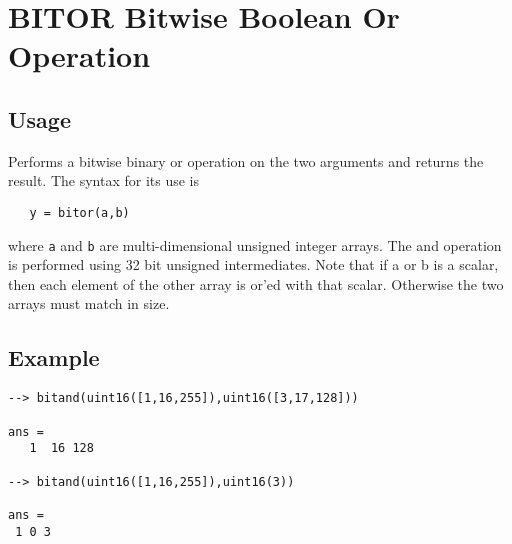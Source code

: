\section{BITOR Bitwise Boolean Or Operation}

\subsection{Usage}

Performs a bitwise binary or operation on the two arguments and
returns the result.  The syntax for its use is
\begin{verbatim}
   y = bitor(a,b)
\end{verbatim}
where \verb|a| and \verb|b| are multi-dimensional unsigned integer arrays.
The and operation is performed using 32 bit unsigned intermediates.  Note that if a
or b is a scalar, then each element of the other array is or'ed with
that scalar.  Otherwise the two arrays must match in size.
\subsection{Example}

\begin{verbatim}
--> bitand(uint16([1,16,255]),uint16([3,17,128]))

ans = 
   1  16 128 

--> bitand(uint16([1,16,255]),uint16(3))

ans = 
 1 0 3 
\end{verbatim}
